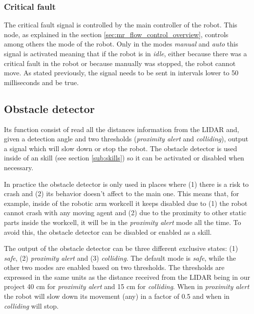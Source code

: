 		\subsubsection{Critical fault} %
		\label{ssub:mr_critical_fault}
		The critical fault signal is controlled by the main controller of the robot.
		This node, as explained in the section \ref{sec:mr_flow_control_overview}, controls among others the mode of the robot.
		Only in the modes \emph{manual} and \emph{auto} this signal is activated meaning that if the robot is in \emph{idle}, either because there was a critical fault in the robot or because manually was stopped, the robot cannot move.
		As stated previously, the signal needs to be sent in intervals lower to 50 milliseconds and be true.

	\subsection{Obstacle detector} %
	\label{sub:mr_obstacle_detector}
	Its function consist of read all the distances information from the LIDAR and, given a detection angle and two thresholds (\emph{proximity alert} and \emph{colliding}), output a signal which will slow down or stop the robot.
	The obstacle detector is used inside of an skill (see section \ref{sub:skills}) so it can be activated or disabled when necessary.

	In practice the obstacle detector is only used in places where (1) there is a risk to crash and (2) its behavior doesn't affect to the main one.
	This means that, for example, inside of the robotic arm workcell it keeps disabled due to (1) the robot cannot crash with any moving agent and (2) due to the proximity to other static parts inside the workcell, it will be in the \emph{proximity alert} mode all the time. 
	To avoid this, the obstacle detector can be disabled or enabled as a skill.

	The output of the obstacle detector can be three different exclusive states: (1) \emph{safe}, (2) \emph{proximity alert} and (3) \emph{colliding}. 
	The default mode is \emph{safe}, while the other two modes are enabled based on two thresholds.
	The thresholds are expressed in the same units as the distance received from the LIDAR being in our project 40 cm for \emph{proximity alert} and 15 cm for \emph{colliding}.
	When in \emph{proximity alert} the robot will slow down its movement (any) in a factor of 0.5 and when in \emph{colliding} will stop.


